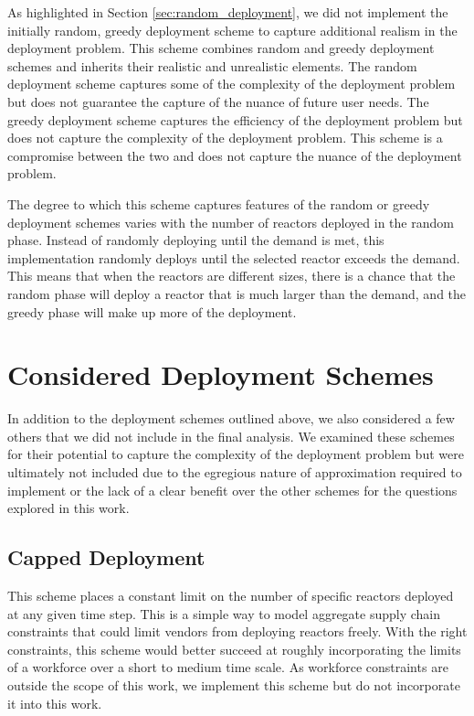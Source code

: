 As highlighted in Section \ref{sec:random_deployment}, we did not implement the
initially random, greedy deployment scheme to capture additional realism in the
deployment problem. This scheme combines random and greedy deployment schemes
and inherits their realistic and unrealistic elements. The random deployment
scheme captures some of the complexity of the deployment problem but does not
guarantee the capture of the nuance of future user needs. The greedy deployment
scheme captures the efficiency of the deployment problem but does not capture
the complexity of the deployment problem. This scheme is a compromise between
the two and does not capture the nuance of the deployment problem.

The degree to which this scheme captures features of the random or greedy
deployment schemes varies with the number of reactors deployed in the random
phase. Instead of randomly deploying until the demand is met, this
implementation randomly deploys until the selected reactor exceeds the demand.
This means that when the reactors are different sizes, there is a chance that
the random phase will deploy a reactor that is much larger than the demand, and
the greedy phase will make up more of the deployment.


\section{Considered Deployment Schemes}
\label{sec:considered_deployment_schemes}
In addition to the deployment schemes outlined above, we also considered a few
others that we did not include in the final analysis. We examined these schemes
for their potential to capture the complexity of the deployment problem but
were ultimately not included due to the egregious nature of approximation
required to implement or the lack of a clear benefit over the other schemes for
the questions explored in this work.

\subsection{Capped Deployment}
\label{sec:capped_deployment}
This scheme places a constant limit on the number of specific reactors deployed
at any given time step. This is a simple way to model aggregate supply chain
constraints that could limit vendors from deploying reactors freely. With the
right constraints, this scheme would better succeed at roughly incorporating
the limits of a workforce over a short to medium time scale. As workforce
constraints are outside the scope of this work, we implement this scheme but do
not incorporate it into this work.

